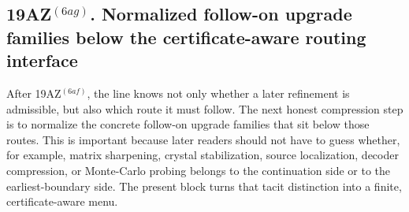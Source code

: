 \subsection*{19AZ$^{(6ag)}$. Normalized follow-on upgrade families below the certificate-aware routing interface}
\label{sec:normalized-follow-on-upgrade-families-below-the-certificate-aware-routing-interface}
After 19AZ$^{(6af)}$, the line knows not only whether a later refinement is admissible, but also which route it must follow. The next honest compression step is to normalize the concrete follow-on upgrade families that sit below those routes. This is important because later readers should not have to guess whether, for example, matrix sharpening, crystal stabilization, source localization, decoder compression, or Monte-Carlo probing belongs to the continuation side or to the earliest-boundary side. The present block turns that tacit distinction into a finite, certificate-aware menu.

